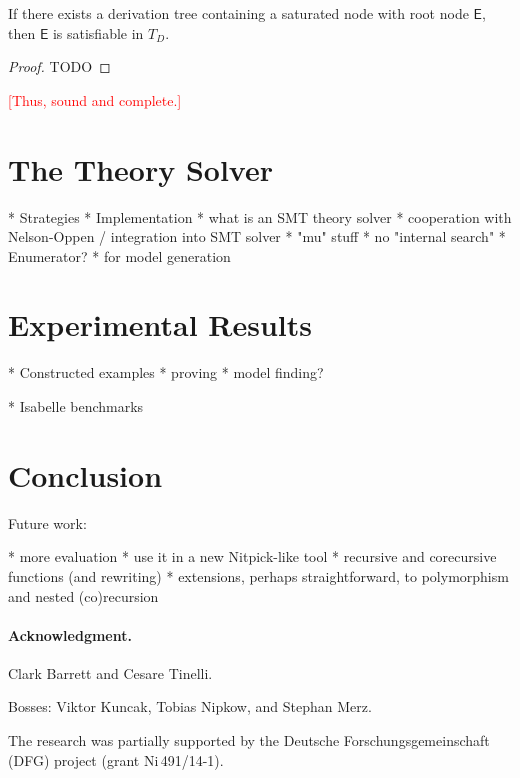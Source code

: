 \documentclass[a4paper,oribibl,envcountsame,draft]{llncs}
\newcommand{\Ec}{\mathsf{E}}
\newcommand{\rem}[1]{\textcolor{red}{[#1]}}
\newcommand{\thD}{T_{D}}
\begin{document}
\begin{lemma}
If there exists a derivation tree containing a saturated node with root node $\Ec$, then $\Ec$ is satisfiable in $\thD$.
\end{lemma}
\begin{proof}
TODO
\end{proof}

\rem{Thus, sound and complete.}
  
\section{The Theory Solver}
\label{sec:the-theory-solver}

  * Strategies
  * Implementation
    * what is an SMT theory solver
    * cooperation with Nelson-Oppen / integration into SMT solver
    * "mu" stuff
    * no "internal search"
  * Enumerator?
    * for model generation


\section{Experimental Results}
\label{sec:experimental-results}

  * Constructed examples
    * proving
    * model finding?

  * Isabelle benchmarks


\section{Conclusion}
\label{sec:conclusion}

Future work:

  * more evaluation
    * use it in a new Nitpick-like tool
  * recursive and corecursive functions
    (and rewriting)
  * extensions, perhaps straightforward, to polymorphism and nested
    (co)recursion

\def\ackname{Acknowledgment}
\paragraph{\ackname.}

Clark Barrett and Cesare Tinelli.

Bosses: Viktor Kuncak, Tobias Nipkow, and Stephan Merz.

The research was partially supported by the Deutsche
Forschungs\-gemein\-schaft (DFG) project
 (grant Ni\,491\slash 14-1).


{}
\end{document}

